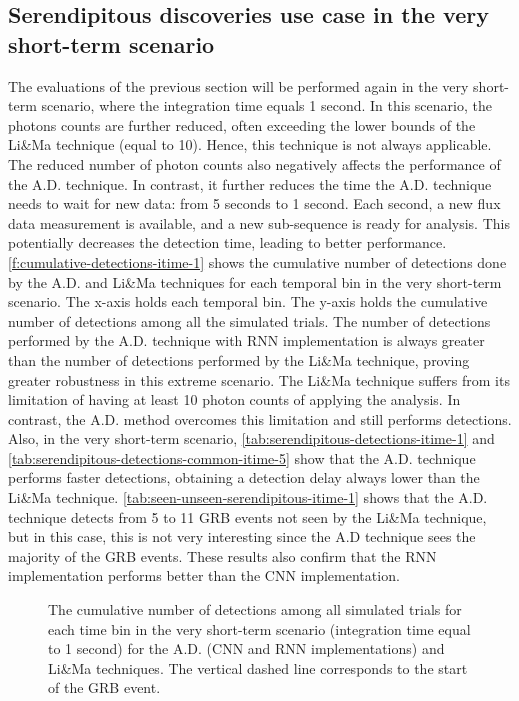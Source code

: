 \subsection{Serendipitous discoveries use case in the very short-term scenario}
\label{s:Serendipitous-Discoveries-Results-very-short-term}
The evaluations of the previous section will be performed again in the very short-term scenario, where the integration time equals 1 second. In this scenario, the photons counts are further reduced, often exceeding the lower bounds of the Li\&Ma technique (equal to 10). Hence, this technique is not always applicable. The reduced number of photon counts also negatively affects the performance of the A.D. technique. In contrast, it further reduces the time the A.D. technique needs to wait for new data: from 5 seconds to 1 second. Each second, a new flux data measurement is available, and a new sub-sequence is ready for analysis. This potentially decreases the detection time, leading to better performance. \autoref{f:cumulative-detections-itime-1} shows the cumulative number of detections done by the A.D. and Li\&Ma techniques for each temporal bin in the very short-term scenario. The x-axis holds each temporal bin. The y-axis holds the cumulative number of detections among all the simulated trials. The number of detections performed by the A.D. technique with RNN implementation is always greater than the number of detections performed by the Li\&Ma technique, proving greater robustness in this extreme scenario. The Li\&Ma technique suffers from its limitation of having at least 10 photon counts of applying the analysis. In contrast, the A.D. method overcomes this limitation and still performs detections. Also, in the very short-term scenario, \autoref{tab:serendipitous-detections-itime-1} and \autoref{tab:serendipitous-detections-common-itime-5} show that the A.D. technique performs faster detections, obtaining a detection delay always lower than the Li\&Ma technique. \autoref{tab:seen-unseen-serendipitous-itime-1} shows that the A.D. technique detects from 5 to 11 GRB events not seen by the Li\&Ma technique, but in this case, this is not very interesting since the A.D technique sees the majority of the GRB events. These results also confirm that the RNN implementation performs better than the CNN implementation. 
\begin{figure}[ht] %
\centering

\caption{The cumulative number of detections among all simulated trials for each time bin in the very short-term scenario (integration time equal to 1 second) for the A.D. (CNN and RNN implementations) and Li\&Ma techniques. The vertical dashed line corresponds to the start of the GRB event.}
\label{f:cumulative-detections-itime-1}
\end{figure}
